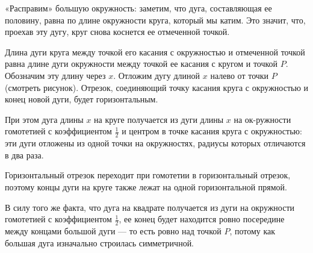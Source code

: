 ﻿
\begin{itemize}
\itA «Расправим» большую окружность: заметим, что дуга, составляющая ее половину, равна по длине окружности круга, который мы катим. Это значит, что, проехав эту дугу, круг снова коснется ее отмеченной точкой.

\begin{center}
\end{center}

\itB Длина дуги круга между точкой его касания с окружностью и отмеченной точкой равна длине дуги окружности между точкой ее касания с кругом и точкой $P$. Обозначим эту длину через $x$. Отложим дугу длиной $x$ налево от точки $P$ (смотреть рисунок). Отрезок, соединяющий точку касания круга с окружностью и конец новой дуги, будет горизонтальным.

При этом дуга длины $x$ на круге получается из дуги длины $x$ на ок-\linebreak ружности гомотетией с коэффициентом $\tfrac{1}{2}$ и центром в точке касания круга с окружностью: эти дуги отложены из одной точки на окружностях, радиусы которых отличаются в два раза.

Горизонтальный отрезок переходит при гомотетии в горизонтальный отрезок, поэтому концы дуги на круге также лежат на одной горизонтальной прямой.

\itC В силу того же факта, что дуга на квадрате получается из дуги на окружности гомотетией с коэффициентом $\tfrac{1}{2}$, ее конец будет находится ровно посередине между концами большой дуги — то есть ровно над точкой $P$, потому как большая дуга изначально строилась симметричной.
\end{itemize}